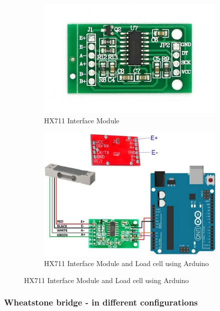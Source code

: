 \documentclass[../report.tex]{subfiles}
\begin{document}
\begin{figure}[H]
  \centering
  \begin{subfigure}[b]{0.4\linewidth}
    \includegraphics[width=\linewidth]{image/HX711-Weighing-Sensor-Dual-Channel-24-Bit-Precision-A-D-Module-Pressure-Sensor_1.jpg}
    \caption{HX711 Interface Module }
  \end{subfigure}
  \begin{subfigure}[b]{0.4\linewidth}
    \includegraphics[width=\linewidth]{image/hx711-red.jpg}
    \caption{HX711 Interface Module and Load cell using Arduino}
  \end{subfigure}
  
  
\end{figure}

\subsubsection{Wheatstone bridge - in different configurations}
\end{document}
